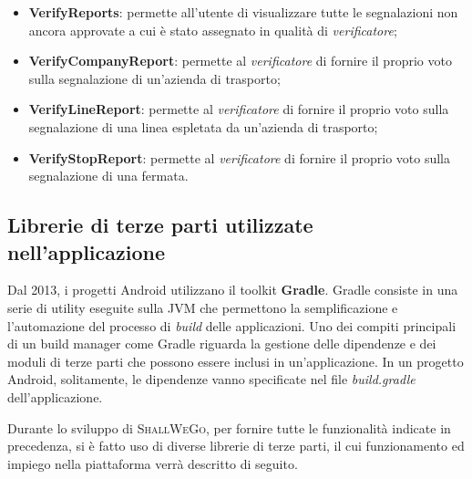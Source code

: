\begin{itemize}
                \item \textbf{VerifyReports}: permette all'utente di visualizzare tutte le segnalazioni non ancora approvate a cui è stato assegnato in qualità di \textit{verificatore};
                \item \textbf{VerifyCompanyReport}: permette al \textit{verificatore} di fornire il proprio voto sulla segnalazione di un'azienda di trasporto;
                \item \textbf{VerifyLineReport}: permette al \textit{verificatore} di fornire il proprio voto sulla segnalazione di una linea espletata da un'azienda di trasporto;
                \item \textbf{VerifyStopReport}: permette al \textit{verificatore} di fornire il proprio voto sulla segnalazione di una fermata.
            \end{itemize}
        
            \subsection{Librerie di terze parti utilizzate nell'applicazione}
                Dal 2013, i progetti Android utilizzano il toolkit \textbf{Gradle}. Gradle consiste in una serie di utility eseguite sulla JVM che permettono la semplificazione e l'automazione del processo di \textit{build} delle applicazioni. Uno dei compiti principali di un build manager come Gradle riguarda la gestione delle dipendenze e dei moduli di terze parti che possono essere inclusi in un'applicazione. In un progetto Android, solitamente, le dipendenze vanno specificate nel file \textit{build.gradle} dell'applicazione.

                Durante lo sviluppo di \textsc{ShallWeGo}, per fornire tutte le funzionalità indicate in precedenza, si è fatto uso di diverse librerie di terze parti, il cui funzionamento ed impiego nella piattaforma verrà descritto di seguito.

